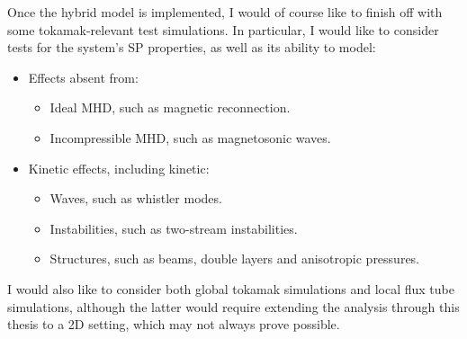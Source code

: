     \begin{remark}
        Once the hybrid model is implemented, I would of course like to finish off with some tokamak-relevant test simulations. In particular, I would like to consider tests for the system's SP properties, as well as its ability to model:
        \begin{itemize}
          \item  Effects absent from:
          \begin{itemize}
              \item  Ideal MHD, such as magnetic reconnection. \cite{Dungey_1961, Lockwood_2016}
              \item  Incompressible MHD, such as magnetosonic waves.
          \end{itemize}
            \item  Kinetic effects, including kinetic:
            \begin{itemize}
                \item  Waves, such as whistler modes. \cite{Chen_2015}
                \item  Instabilities, such as two-stream instabilities. \cite{ONeil_Malmberg_1968, Stix_1992}
                \item  Structures, such as beams, double layers and anisotropic pressures.
            \end{itemize}
        \end{itemize}
        I would also like to consider both global tokamak simulations and local flux tube simulations, although the latter would require extending the analysis through this thesis to a 2D setting, which may not always prove possible.
    \end{remark}
    